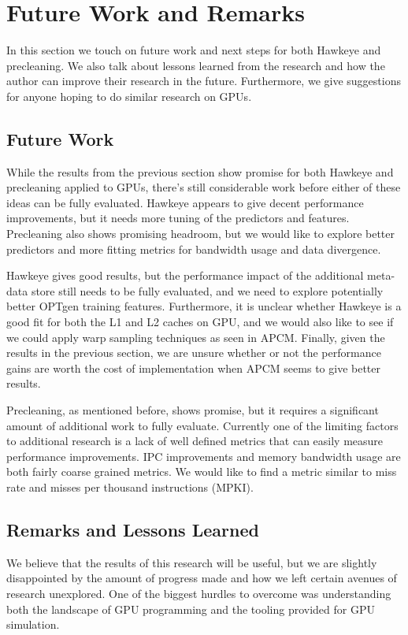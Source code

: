 \chapter{Future Work and Remarks}
In this section we touch on future work and next steps for both Hawkeye and precleaning. We also talk about lessons learned from the research and how the author can improve their research in the future. Furthermore, we give suggestions for anyone hoping to do similar research on GPUs.

\section{Future Work}
While the results from the previous section show promise for both Hawkeye and precleaning applied to GPUs, there's still considerable work before either of these ideas can be fully evaluated. Hawkeye appears to give decent performance improvements, but it needs more tuning of the predictors and features. Precleaning also shows promising headroom, but we would like to explore better predictors and more fitting metrics for bandwidth usage and data divergence.

Hawkeye gives good results, but the performance impact of the additional meta-data store still needs to be fully evaluated, and we need to explore potentially better OPTgen training features. Furthermore, it is unclear whether Hawkeye is a good fit for both the L1 and L2 caches on GPU, and we would also like to see if we could apply warp sampling techniques as seen in APCM. Finally, given the results in the previous section, we are unsure whether or not the performance gains are worth the cost of implementation when APCM seems to give better results.

Precleaning, as mentioned before, shows promise, but it requires a significant amount of additional work to fully evaluate. Currently one of the limiting factors to additional research is a lack of well defined metrics that can easily measure performance improvements. IPC improvements and memory bandwidth usage are both fairly coarse grained metrics. We would like to find a metric similar to miss rate and misses per thousand instructions (MPKI). 

\section{Remarks and Lessons Learned}
We believe that the results of this research will be useful, but we are slightly disappointed by the amount of progress made and how we left certain avenues of research unexplored. One of the biggest hurdles to overcome was understanding both the landscape of GPU programming and the tooling provided for GPU simulation.

